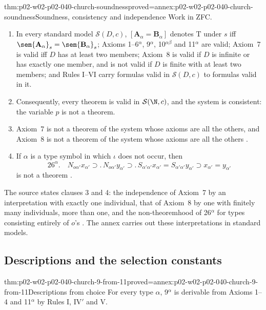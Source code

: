 \begin{hbtheorem}{thm:p02-w02-p02-040-church-soundness}{proved=annex:p02-w02-p02-040-church-soundness}{Soundness, consistency and independence}
Work in ZFC.
\begin{enumerate}
 \item In every standard model \(\mathcal S(D,c)\),
   \([\mathbf A_\alpha=\mathbf B_\alpha]\) denotes \(\mathrm T\) under \(s\) iff
   \(\sem{\mathbf A_\alpha}_s=\sem{\mathbf B_\alpha}_s\); Axioms 1--6\(^\alpha\),
   9\(^\alpha\), 10\(^{\alpha\beta}\) and 11\(^\alpha\) are valid; Axiom~7 is
   valid iff \(D\) has at least two members; Axiom~8 is valid if \(D\) is
   infinite or has exactly one member, and is not valid if \(D\) is finite
   with at least two members; and Rules I--VI carry formulas valid in
   \(\mathcal S(D,c)\) to formulas valid in it.
 \item Consequently, every theorem is valid in \(\mathcal S(\N,c)\), and
   the system is consistent: the variable \(p\) is not a theorem.
 \item Axiom~7 is not a theorem of the system whose axioms are all the
   others, and Axiom~8 is not a theorem of the system whose axioms are all
   the others \cite[\S4, p.~61]{Church1940}.
 \item If \(\alpha\) is a type symbol in which \(\iota\) does not occur, then
   \[
    26^\alpha.\quad N_{o\alpha'}x_{\alpha'}\supset.\,N_{o\alpha'}y_{\alpha'}\supset.\,
    S_{\alpha'\alpha'}x_{\alpha'}=S_{\alpha'\alpha'}y_{\alpha'}\supset x_{\alpha'}=y_{\alpha'}
   \]
   is not a theorem \cite[\S6, p.~64]{Church1940}.
\end{enumerate}
\end{hbtheorem}

The source states clauses 3 and 4: the independence of Axiom~7 by an
interpretation with exactly one individual, that of Axiom~8 by one with
finitely many individuals, more than one, and the non-theoremhood of
26\(^\alpha\) for types consisting entirely of \(o\)'s
\cite[\S4, p.~61; \S6, p.~64]{Church1940}.  The annex carries out these
interpretations in standard models.

\subsection{Descriptions and the selection constants}

\begin{hbtheorem}{thm:p02-w02-p02-040-church-9-from-11}{proved=annex:p02-w02-p02-040-church-9-from-11}{Descriptions from choice}
For every type \(\alpha\), 9\(^\alpha\) is derivable from Axioms 1--4 and
11\(^\alpha\) by Rules I, IV\('\) and V.
\end{hbtheorem}

